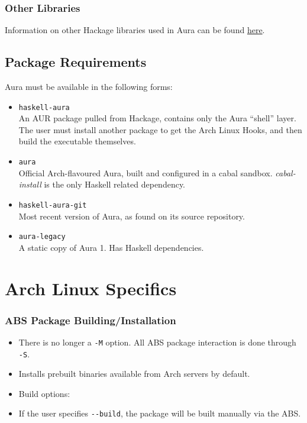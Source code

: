 \documentclass{article}
\begin{document}
\subsubsection{Other Libraries}\label{other-libraries}
Information on other Hackage libraries used in Aura can be found
\href{https://github.com/fosskers/aura/issues/223}{here}.

\subsection{Package Requirements}\label{package-requirements}
Aura must be available in the following forms:
\begin{itemize}
  \item \texttt{haskell-aura}\\
    An AUR package pulled from Hackage, contains only the Aura ``shell'' layer.
    The user must install another package to get the Arch Linux Hooks, and
    then build the executable themselves.
  \item \texttt{aura}\\ Official Arch-flavoured Aura, built and configured
    in a cabal sandbox. \emph{cabal-install} is the only Haskell related
    dependency.
  \item \texttt{haskell-aura-git}\\ Most recent version of Aura, as found
    on its source repository.
  \item \texttt{aura-legacy}\\
    A static copy of Aura 1. Has Haskell dependencies.
\end{itemize}


\section{Arch Linux Specifics}\label{arch-linux-specifics}

\subsubsection{ABS Package
Building/Installation}\label{abs-package-buildinginstallation}

\begin{itemize}
\itemsep1pt\parskip0pt
\item
  There is no longer a \texttt{-M} option. All ABS package interaction
  is done through \texttt{-S}.
\item
  Installs prebuilt binaries available from Arch servers by default.
\item
  Build options:
\item
  If the user specifies \texttt{-\/-build}, the package will be built
  manually via the ABS.
\end{itemize}
\end{document}

